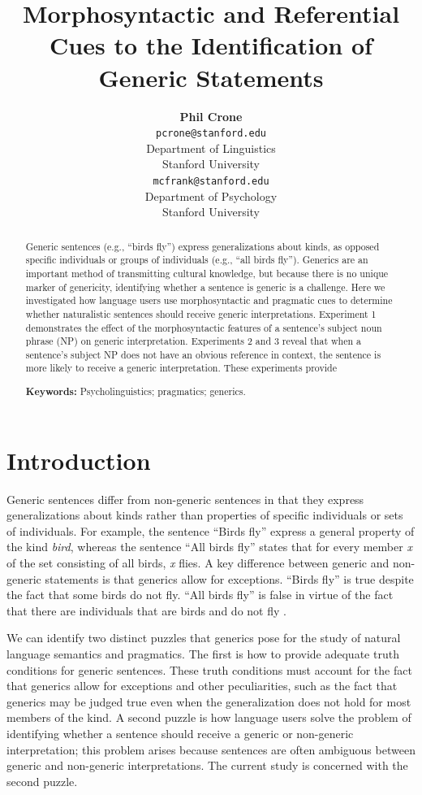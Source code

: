 \documentclass[10pt,letterpaper]{article}
\title{Morphosyntactic and Referential Cues to the Identification of Generic Statements}
\author{{\large \bf Phil Crone} \\
	\texttt{pcrone@stanford.edu}\\
  Department of Linguistics \\
  Stanford University
  \And {\large \bf Michael C. Frank} \\
  \texttt{mcfrank@stanford.edu}\\
  Department of Psychology \\
  Stanford University}
\begin{document}
\maketitle

\begin{abstract}
Generic sentences (e.g., ``birds fly'') express generalizations about kinds, as opposed specific individuals or groups of individuals (e.g., ``all birds fly''). Generics are an important method of transmitting cultural knowledge, but because there is no unique marker of genericity, identifying whether a sentence is generic is a challenge. Here we investigated how language users use morphosyntactic and pragmatic cues to determine whether naturalistic sentences should receive generic interpretations. Experiment 1 demonstrates the effect of the morphosyntactic features of a sentence's subject noun phrase (NP) on generic interpretation. Experiments 2 and 3 reveal that when a sentence's subject NP does not have an obvious reference in context, the sentence is more likely to receive a generic interpretation. These experiments provide

\textbf{Keywords:} Psycholinguistics; pragmatics; generics.
\end{abstract}


\section{Introduction}


Generic sentences differ from non-generic sentences in that they express generalizations about kinds rather than properties of specific individuals or sets of individuals. For example, the sentence ``Birds fly'' express a general property of the kind \textit{bird}, whereas the sentence ``All birds fly'' states that for every member \textit{x} of the set consisting of all birds, \textit{x} flies. A key difference between generic and non-generic statements is that generics allow for exceptions. ``Birds fly'' is true despite the fact that some birds do not fly. ``All birds fly'' is false in virtue of the fact that there are individuals that are birds and do not fly \cite{Prasada:2000}. 

We can identify two distinct puzzles that generics pose for the study of natural language semantics and pragmatics. The first is how to provide adequate truth conditions for generic sentences. These truth conditions must account for the fact that generics allow for exceptions and other peculiarities, such as the fact that generics may be judged true even when the generalization does not hold for most members of the kind. A second puzzle is how language users solve the problem of identifying whether a sentence should receive a generic or non-generic interpretation; this problem arises because sentences are often ambiguous between generic and non-generic interpretations. The current study is concerned with the second puzzle.
\end{document}

